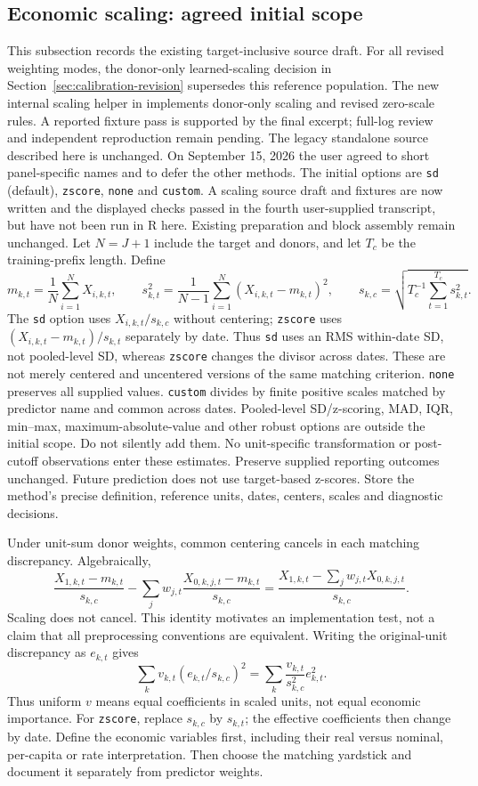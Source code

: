 \documentclass[11pt]{article}
\begin{document}
\subsection{Economic scaling: agreed initial scope}
This subsection records the existing target-inclusive source draft.
For all revised weighting modes, the donor-only learned-scaling decision in
Section~\ref{sec:calibration-revision} supersedes this reference population.
The new internal scaling helper in  implements
donor-only scaling and revised zero-scale rules. A reported fixture pass
is supported by the final excerpt; full-log review and independent
reproduction remain pending. The legacy standalone source described here is unchanged.
On September 15, 2026 the user agreed to short panel-specific names and
to defer the other methods. The initial options are \texttt{sd} (default),
\texttt{zscore}, \texttt{none} and \texttt{custom}. A scaling source draft
and fixtures are now written and the displayed checks passed in the fourth
user-supplied transcript, but have not been run in R here. Existing preparation and block assembly remain
unchanged. Let $N=J+1$ include the target and donors, and let $T_c$ be the
training-prefix length. Define
\[
 m_{k,t}=\frac1N\sum_{i=1}^N X_{i,k,t},\qquad
 s_{k,t}^2=\frac1{N-1}\sum_{i=1}^N(X_{i,k,t}-m_{k,t})^2,
 \qquad s_{k,c}=\sqrt{T_c^{-1}\sum_{t=1}^{T_c}s_{k,t}^2}.
\]
The \texttt{sd} option uses $X_{i,k,t}/s_{k,c}$ without centering;
\texttt{zscore} uses $(X_{i,k,t}-m_{k,t})/s_{k,t}$ separately by date.
Thus \texttt{sd} uses an RMS within-date SD, not pooled-level SD, whereas
\texttt{zscore} changes the divisor across dates. These are not merely
centered and uncentered versions of the same matching criterion.
\texttt{none} preserves all supplied values. \texttt{custom} divides by
finite positive scales matched by predictor name and common across dates.
Pooled-level SD/z-scoring, MAD, IQR, min--max, maximum-absolute-value and
other robust options are outside the initial scope. Do not silently add them.
No unit-specific transformation or post-cutoff observations enter these
estimates. Preserve supplied reporting outcomes unchanged. Future prediction
does not use target-based z-scores. Store the method's precise definition,
reference units, dates, centers, scales and diagnostic decisions.

Under unit-sum donor weights, common centering cancels in each matching
discrepancy. Algebraically,
\[
 \frac{X_{1,k,t}-m_{k,t}}{s_{k,c}}
 -\sum_jw_{j,t}\frac{X_{0,k,j,t}-m_{k,t}}{s_{k,c}}
 =\frac{X_{1,k,t}-\sum_jw_{j,t}X_{0,k,j,t}}{s_{k,c}}.
\]
Scaling does not cancel. This identity motivates an implementation test,
not a claim that all preprocessing conventions are equivalent.
Writing the original-unit discrepancy as $e_{k,t}$ gives
\[
 \sum_kv_{k,t}(e_{k,t}/s_{k,c})^2
 =\sum_k\frac{v_{k,t}}{s_{k,c}^2}e_{k,t}^2.
\]
Thus uniform $v$ means equal coefficients in scaled units, not equal
economic importance. For \texttt{zscore}, replace $s_{k,c}$ by $s_{k,t}$;
the effective coefficients then change by date. Define the economic variables first, including their
real versus nominal, per-capita or rate interpretation. Then choose the
matching yardstick and document it separately from predictor weights.
\end{document}
